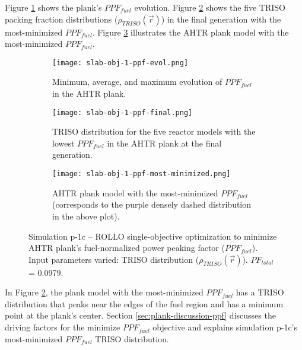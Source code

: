 Figure \ref{fig:slab-obj-1-ppf-evol} shows the plank's $PPF_{fuel}$ evolution. 
Figure \ref{fig:slab-obj-1-ppf-final} shows the five \gls{TRISO} 
packing fraction distributions ($\rho_{TRISO}(\vec{r})$) in the final generation 
with the most-minimized $PPF_{fuel}$. 
Figure \ref{fig:slab-obj-1-ppf-most-minimized} illustrates the \gls{AHTR} plank model 
with the most-minimized $PPF_{fuel}$. 
\begin{figure}[htbp!]
    \centering
    \begin{subfigure}{0.9\textwidth}
        \texttt{[image: slab-obj-1-ppf-evol.png]}
        \caption{Minimum, average, and maximum evolution of $PPF_{fuel}$ in the 
        AHTR plank.}
        \label{fig:slab-obj-1-ppf-evol} 
    \end{subfigure}
    \begin{subfigure}{0.9\textwidth}
        \texttt{[image: slab-obj-1-ppf-final.png]}
        \caption{TRISO distribution for the five reactor models with the 
        lowest $PPF_{fuel}$ in the AHTR plank at the final generation.}
        \label{fig:slab-obj-1-ppf-final} 
    \end{subfigure}
    \begin{subfigure}{0.9\textwidth}
        \texttt{[image: slab-obj-1-ppf-most-minimized.png]}
        \caption{\gls{AHTR} plank model with the most-minimized $PPF_{fuel}$
        (corresponds to the purple densely dashed distribution in the above plot).}
        \label{fig:slab-obj-1-ppf-most-minimized} 
    \end{subfigure}
    \caption{Simulation p-1c -- ROLLO single-objective optimization to minimize 
    AHTR plank's fuel-normalized power peaking factor ($PPF_{fuel}$). 
    Input parameters varied: TRISO distribution ($\rho_{TRISO}(\vec{r})$).
    $PF_{total}$ = 0.0979.}
    \label{fig:slab-obj-1-ppf}
\end{figure}

In Figure \ref{fig:slab-obj-1-ppf-final}, the plank model with the most-minimized 
$PPF_{fuel}$ has a TRISO distribution that peaks near the edges of the fuel region and 
has a minimum point at the plank's center.
Section \ref{sec:plank-discussion-ppf} discusses the driving factors for the minimize 
$PPF_{fuel}$ objective and explains simulation p-1c's most-minimized $PPF_{fuel}$ 
TRISO distribution. 

